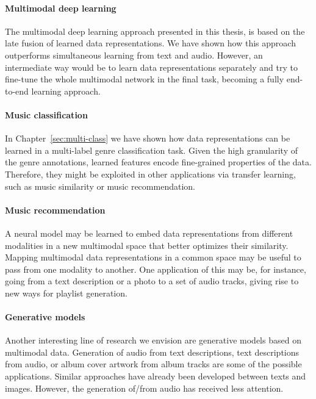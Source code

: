 \paragraph{Multimodal deep learning}
The multimodal deep learning approach presented in this thesis, is based on the late fusion of learned data representations. We have shown how this approach outperforms simultaneous learning from text and audio. However, an intermediate way would be to learn data representations separately and try to fine-tune the whole multimodal network in the final task, becoming a fully end-to-end learning approach.

\paragraph{Music classification} In Chapter~\ref{sec:multi-class} we have shown how data representations can be learned in a multi-label genre classification task. Given the high granularity of the genre annotations, learned features encode fine-grained properties of the data. Therefore, they might be exploited in other applications via transfer learning, such as music similarity or music recommendation. 

\paragraph{Music recommendation} A neural model may be learned to embed data representations from different modalities in a new multimodal space that better optimizes their similarity. Mapping multimodal data representations in a common space may be useful to pass from one modality to another. One application of this may be, for instance, going from a text description or a photo to a set of audio tracks, giving rise to new ways for playlist generation.

\paragraph{Generative models} Another interesting line of research we envision are generative models based on multimodal data. Generation of audio from text descriptions, text descriptions from audio, or album cover artwork from album tracks are some of the possible applications. Similar approaches have already been developed between texts and images. However, the generation of/from audio has received less attention.

\vspace{0.4cm}

